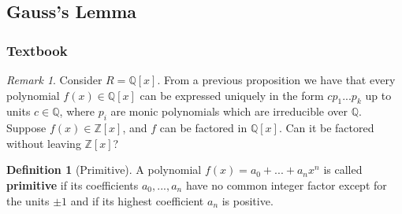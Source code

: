 \documentclass[12pt]{article}
\theoremstyle{definition}
\newtheorem{defn}[thm]{Definition}
\theoremstyle{remark}
\newtheorem{rmk}[thm]{Remark}
\numberwithin{equation}{section}
\newcommand\Z{\mathbb Z}    %
\newcommand\Q{\mathbb Q}    %
\newcommand\B[1]{\textbf{ #1}}
\begin{document}
\vspace{15pt}


\subsection{Gauss's Lemma}

\subsubsection{Textbook}

\begin{rmk}
        Consider $R = \Q[x]$. From a previous proposition we have that every polynomial $f(x) \in \Q[x]$ can be expressed uniquely in the form $cp_1...p_k$ up to units $c \in \Q$, where $p_i$ are monic polynomials which are irreducible over $\Q$. Suppose $f(x) \in \Z[x]$, and $f$ can be factored in $\Q[x]$. Can it be factored without leaving $\Z[x]$? 
\end{rmk}

\vspace{15pt}

\begin{defn}[Primitive]
        A polynomial $f(x) = a_0 + ... + a_nx^n$ is called \B{primitive} if its coefficients $a_0,...,a_n$ have no common integer factor except for the units $\pm 1$ and if its highest coefficient $a_n$ is positive.
\end{defn}

\vspace{15pt}
\end{document}
